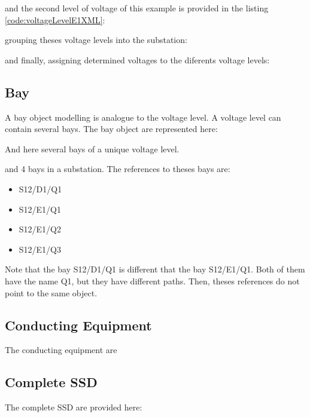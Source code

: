 	and the second level of voltage of this example is provided
	in the listing \ref{code:voltageLevelE1XML}:
	
	
	grouping theses voltage levels into the substation:
	
	
	and finally, assigning determined voltages to the 
	diferents voltage levels:
	


\subsection{Bay}
	A bay object modelling is analogue to the voltage level. 
	A voltage level can contain several bays.
	The bay object are represented here:
	
	
	And here several bays of a unique voltage level.
	
	
	and 4 bays in a substation. The references to 
	theses bays are:
	\begin{itemize}
	  \item S12/D1/Q1
	  \item S12/E1/Q1
	  \item S12/E1/Q2
	  \item S12/E1/Q3
	\end{itemize}  
	Note that the bay S12/D1/Q1 is different that the 
	bay S12/E1/Q1. Both of them have the name Q1, but 
	they have different paths. Then, theses references 
	do not point to the same object.
	

\subsection{Conducting Equipment}
The conducting equipment are 









\subsection{Complete SSD}
The complete SSD are provided here:
%






